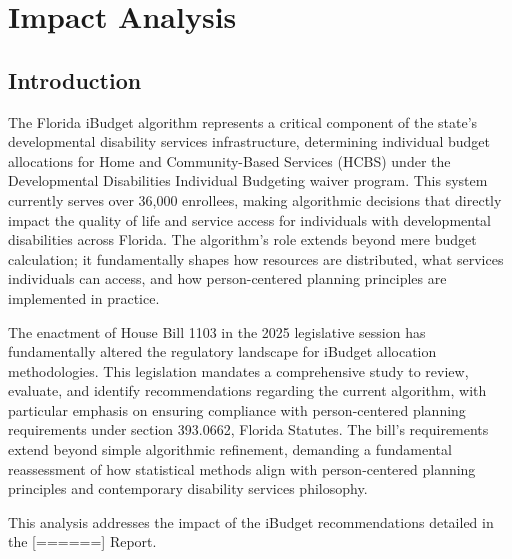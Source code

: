 ﻿\chapter{Impact Analysis}\newpage

\section{Introduction}

The Florida iBudget algorithm represents a critical component of the state's developmental disability services infrastructure, determining individual budget allocations for Home and Community-Based Services (HCBS) under the Developmental Disabilities Individual Budgeting waiver program. This system currently serves over 36,000 enrollees, making algorithmic decisions that directly impact the quality of life and service access for individuals with developmental disabilities across Florida. The algorithm's role extends beyond mere budget calculation; it fundamentally shapes how resources are distributed, what services individuals can access, and how person-centered planning principles are implemented in practice.

The enactment of House Bill 1103 in the 2025 legislative session has fundamentally altered the regulatory landscape for iBudget allocation methodologies. This legislation mandates a comprehensive study to review, evaluate, and identify recommendations regarding the current algorithm, with particular emphasis on ensuring compliance with person-centered planning requirements under section 393.0662, Florida Statutes. The bill's requirements extend beyond simple algorithmic refinement, demanding a fundamental reassessment of how statistical methods align with person-centered planning principles and contemporary disability services philosophy.

This analysis addresses the impact of the iBudget recommendations detailed in the [======] Report. 

